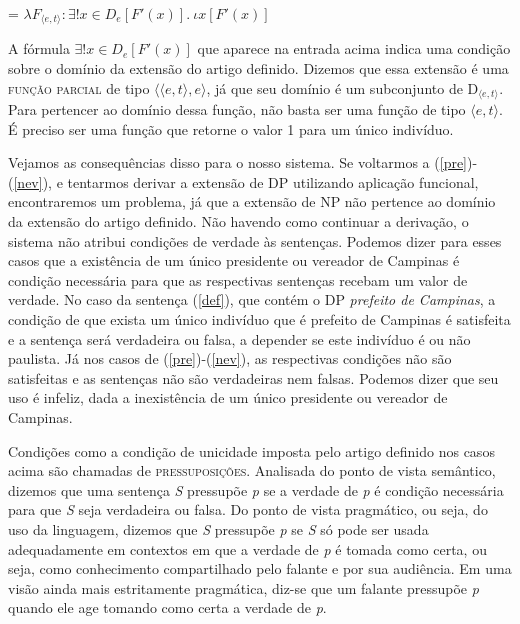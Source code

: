 \begin{exe}
	\ex {} = $\lambda F_{\langle e,t\rangle}:\exists !x \in D_{e}[ F'(x)].\ \iota x[F'(x)]$
\end{exe}


\n A fórmula \underline{$\exists !x \in D_{e}[
F'(x)]$} que aparece na entrada acima indica uma
condição sobre o domínio da extensão do artigo definido. Dizemos
que essa extensão é uma \textsc{função parcial} de tipo
$\langle\langle e,t\rangle ,e\rangle$, já que seu domínio é um
subconjunto de D$_{\langle e,t\rangle}$. Para pertencer ao domínio
dessa função, não basta ser uma função de tipo $\langle
e,t\rangle$. É preciso ser uma função que retorne o valor 1 para
um único indivíduo.

Vejamos as consequências disso para o nosso sistema. Se voltarmos
a (\ref{pre})-(\ref{nev}), e tentarmos derivar a extensão de DP
utilizando aplicação funcional, encontraremos um problema, já que
a extensão de NP não pertence ao domínio da extensão do artigo
definido. Não havendo como continuar a derivação, o sistema não
atribui condições de verdade às sentenças. Podemos dizer
para esses casos que a existência de um único presidente ou
vereador de Campinas é condição necessária para que as respectivas
sentenças recebam um valor de verdade. No caso da sentença
(\ref{def}), que contém o DP \textit{prefeito de Campinas}, a condição de
que exista um único indivíduo que é prefeito de Campinas é
satisfeita e a sentença será verdadeira ou falsa, a depender se
este indivíduo é ou não paulista. Já nos casos de
(\ref{pre})-(\ref{nev}), as respectivas condições não são
satisfeitas e as sentenças não são verdadeiras nem falsas. Podemos
dizer que seu uso é infeliz, dada a inexistência de um único
presidente ou vereador de Campinas.

Condições como a condição de unicidade imposta pelo artigo
definido nos casos acima são chamadas de \textsc{pressuposições}.
Analisada do ponto de vista semântico, dizemos que uma sentença
\textit{S} pressupõe \textit{p} se a verdade de \textit{p} é
condição necessária para que \textit{S} seja verdadeira ou falsa.
Do ponto de vista pragmático, ou seja, do uso da linguagem,
dizemos que \textit{S} pressupõe \textit{p} se \textit{S} só pode
ser usada adequadamente em contextos em que a verdade de
\textit{p} é tomada como certa, ou seja, como conhecimento compartilhado pelo falante e por sua audiência. Em uma visão ainda mais estritamente pragmática, diz-se que um falante pressupõe \textit{p} quando ele age tomando como certa a verdade de \textit{p}.

